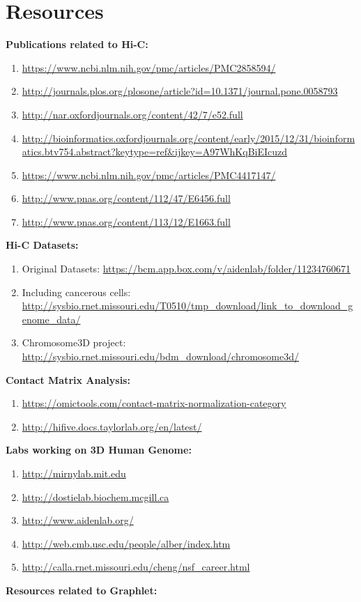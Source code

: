 \documentclass{article}
\begin{document}
\doublespacing
\setlength{\parindent}{0pt}
\section{Resources}
\textbf{Publications related to Hi-C:}
\begin{enumerate}
    \item \url{https://www.ncbi.nlm.nih.gov/pmc/articles/PMC2858594/}
    \item \url{http://journals.plos.org/plosone/article?id=10.1371/journal.pone.0058793 }
    \item \url{http://nar.oxfordjournals.org/content/42/7/e52.full}
    \item \url{http://bioinformatics.oxfordjournals.org/content/early/2015/12/31/bioinformatics.btv754.abstract?keytype=ref&ijkey=A97WhKqBiEIcuzd}
    \item \url{https://www.ncbi.nlm.nih.gov/pmc/articles/PMC4417147/}
    \item \url{http://www.pnas.org/content/112/47/E6456.full}
    \item \url{http://www.pnas.org/content/113/12/E1663.full}
\end{enumerate}
\textbf{Hi-C Datasets:}
\begin{enumerate}
    \item Original Datasets: \url{https://bcm.app.box.com/v/aidenlab/folder/11234760671}
    \item Including cancerous cells: \url{http://sysbio.rnet.missouri.edu/T0510/tmp_download/link_to_download_genome_data/}
    \item Chromosome3D project: \url{http://sysbio.rnet.missouri.edu/bdm_download/chromosome3d/}
\end{enumerate}
\textbf{Contact Matrix Analysis:}
\begin{enumerate}
    \item \url{https://omictools.com/contact-matrix-normalization-category}
    \item \url{http://hifive.docs.taylorlab.org/en/latest/}
\end{enumerate}

\textbf{Labs working on 3D Human Genome:}

\begin{enumerate}
    \item \url{http://mirnylab.mit.edu}
    \item \url{http://dostielab.biochem.mcgill.ca}
    \item \url{http://www.aidenlab.org/}
    \item \url{http://web.cmb.usc.edu/people/alber/index.htm}
    \item \url{http://calla.rnet.missouri.edu/cheng/nsf_career.html}
\end{enumerate}
\textbf{Resources related to Graphlet:}
\end{document}
